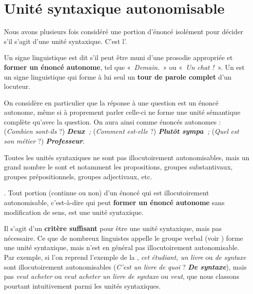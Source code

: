 \section{Unité syntaxique autonomisable}\label{sec:3.2.11}

Nous avons plusieurs fois considéré une portion d’énoncé isolément pour décider s’il s’agit d’une unité syntaxique. C’est l’.

\begin{styleLivreImportant}
Un signe linguistique est dit  s’il peut être muni d’une prosodie appropriée et \textbf{former un énoncé autonome}, tel que «~\textit{Demain.~}» ou «~\textit{Un chat !~}». Un  est un signe linguistique qui forme à lui seul un \textbf{tour de parole complet} d’un locuteur.
\end{styleLivreImportant}

On considère en particulier que la réponse à une question est un énoncé autonome, même si à proprement parler celle-ci ne forme une unité sémantique complète qu’avec la question. On aura ainsi comme énoncés autonomes : (\textit{Combien sont-ils} ?) \textbf{\textit{Deux~}}\textit{;} (\textit{Comment est-elle} ?) \textbf{\textit{Plutôt sympa~}}\textit{;} (\textit{Quel est son métier} ?) \textbf{\textit{Professeur}}.

Toutes les unités syntaxiques ne sont pas illocutoirement autonomisables, mais un grand nombre le sont et notamment les propositions, groupes substantivaux, groupes prépositionnels, groupes adjectivaux, etc.

\begin{styleLivreImportant}
. Tout portion (continue ou non) d’un énoncé qui est illocutoirement autonomisable, c’est-à-dire qui peut \textbf{former un énoncé autonome} sans modification de sens, est une unité syntaxique.
\end{styleLivreImportant}

Il s’agit d’un \textbf{critère suffisant} pour être une unité syntaxique, mais pas nécessaire. Ce que de nombreux linguistes appelle le groupe verbal (voir ) forme une unité syntaxique, mais n’est en général pas illocutoirement autonomisable. Par exemple, si l’on reprend l’exemple de la , \textit{cet étudiant, un livre} ou \textit{de syntaxe} sont illocutoirement autonomisables (\textit{C’est un livre de quoi} ? \textbf{\textit{De syntaxe}}), mais pas \textit{veut acheter} ou \textit{veut acheter un livre de syntaxe} ou \textit{veut}, que nous classons pourtant intuitivement parmi les unités syntaxiques.

